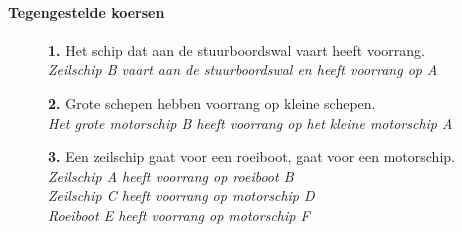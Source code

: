 \paragraph{Tegengestelde koersen}
\vspace{-0.2cm}
\begin{figure}[H]
	\centering
	\begin{minipage}[t]{0.70\textwidth}
		\textbf{1.} Het schip dat aan de stuurboordswal vaart heeft voorrang.\\
		\textit{Zeilschip B vaart aan de stuurboordswal en heeft voorrang op A}
	\end{minipage}
	\hfill
	\begin{minipage}[t]{0.25\textwidth}
		\label{pic:tg1}
	\end{minipage}
	\hfill
\end{figure}
\vspace{-0.7cm}

\begin{figure}[H]
	\centering
	\begin{minipage}[t]{0.70\textwidth}
		\textbf{2.} Grote schepen hebben voorrang op kleine schepen.\\
		\textit{Het grote motorschip B heeft voorrang op het kleine motorschip A}
	\end{minipage}
	\hfill
	\begin{minipage}[t]{0.25\textwidth}
		\label{pic:tg2}
	\end{minipage}
	\hfill
\end{figure}
\vspace{-0.7cm}

\begin{figure}[H]
	\centering
	\begin{minipage}[t]{0.70\textwidth}
		\textbf{3.} Een zeilschip gaat voor een roeiboot, gaat voor een motorschip.\\
		\textit{Zeilschip A heeft voorrang op roeiboot B \\
			Zeilschip C heeft voorrang op motorschip D \\
			Roeiboot E heeft voorrang op motorschip F}
	\end{minipage}
	\hfill
	\begin{minipage}[t]{0.25\textwidth}
		\label{pic:tg3a}
	\end{minipage}
	\hfill
\end{figure}
\vspace{-0.7cm}

